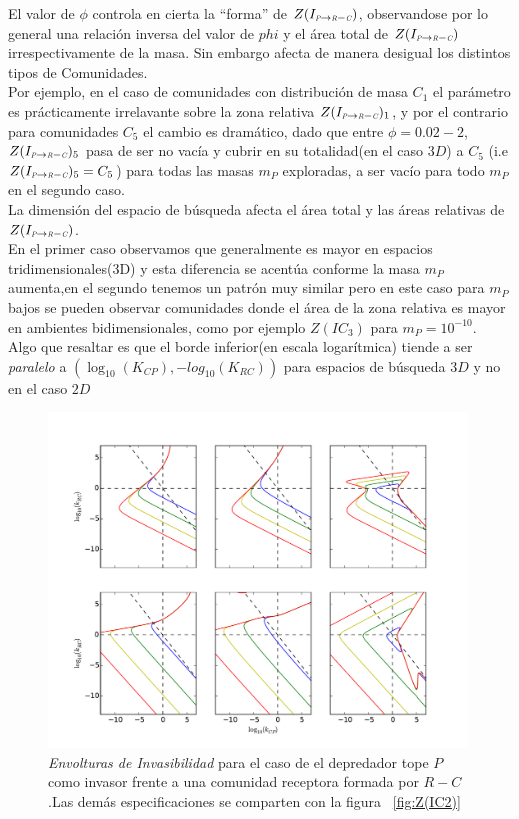 El valor de $\phi$ controla en cierta la ``forma'' de $Z(I_{\textit{\tiny P} \to \textit{\tiny R} - \textit{\tiny C}})$, observandose por lo general una relaci\'on inversa del valor de $phi$ y el \'area total de $Z(I_{\textit{\tiny P} \to \textit{\tiny R} - \textit{\tiny C}})$ irrespectivamente de la masa. Sin embargo afecta de manera desigual los distintos tipos de Comunidades.\\ Por ejemplo, en el caso de comunidades con distribuci\'on de masa $C_1$ el par\'ametro es pr\'acticamente irrelavante sobre la zona relativa $Z(I_{\textit{\tiny P} \to \textit{\tiny R} - \textit{\tiny C}})_1$, y por el contrario para comunidades $C_5$ el cambio es dram\'atico, dado que entre $\phi  = 0.02 - 2$, $Z(I_{\textit{\tiny P} \to \textit{\tiny R} - \textit{\tiny C}})_5$ pasa de ser no vac\'ia y cubrir en su totalidad(en el caso $3D$) a $C_5$ (i.e $Z(I_{\textit{\tiny P} \to \textit{\tiny R} - \textit{\tiny C}})_5 = C_5$) para todas las masas $m_P$ exploradas, a ser vac\'io para todo $m_P$ en el segundo caso.\\
La dimensi\'on del espacio de b\'usqueda afecta el \'area total y las \'areas relativas de $Z(I_{\textit{\tiny P} \to \textit{\tiny R} - \textit{\tiny C}})$.\\
En el primer caso observamos que generalmente es mayor en espacios tridimensionales(3D) y esta diferencia se acent\'ua conforme la masa $m_P$ aumenta,en el segundo  tenemos un patr\'on muy similar pero en este caso para $m_P$ bajos se pueden observar comunidades donde el \'area de la zona relativa es mayor en ambientes bidimensionales, como por ejemplo $Z(IC_3)$ para $m_P = 10^{-10}$. \\
Algo que resaltar es que el borde inferior(en escala logar\'itmica) tiende a ser \emph{paralelo} a $(\log_{10}(K_{CP}),-log_{10}(K_{RC}))$ para espacios de b\'usqueda $3D$ y no en el caso $2D$


\begin{figure}
  \centering
  \includegraphics[width = 0.99\textwidth]{./Plots/Z(IC4)AcGrGr.pdf}
  \caption[Env $Z(IC4)$]{\emph{Envolturas de Invasibilidad} para el caso de el depredador tope $P$ como invasor frente a una comunidad receptora formada por $R-C$ .Las dem\'as especificaciones se comparten con la figura ~\ref{fig:Z(IC2)}}
  \label{fig:Z(IC4)}
\end{figure}


